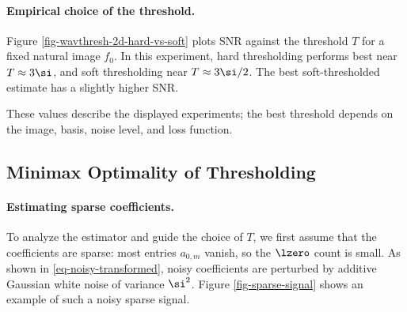 \paragraph{Empirical choice of the threshold.}

Figure \ref{fig-wavthresh-2d-hard-vs-soft} plots SNR against the threshold $T$ for a fixed natural image $f_0$. In this experiment, hard thresholding performs best near $T \approx 3\si$, and soft thresholding near $T\approx 3\si/2$. The best soft-thresholded estimate has a slightly higher SNR.


These values describe the displayed experiments; the best threshold depends on the image, basis, noise level, and loss function.


\subsection{Minimax Optimality of Thresholding}
\label{subsec-minimax-denoise}

\paragraph{Estimating sparse coefficients.}

To analyze the estimator and guide the choice of $T$, we first assume that the coefficients
are sparse: most entries $a_{0,m}$ vanish, so the $\lzero$ count
is small. 
As shown in \eqref{eq-noisy-transformed}, noisy coefficients 
are perturbed by additive Gaussian white noise of variance $\si^2$. Figure \ref{fig-sparse-signal} shows an example of such a noisy sparse signal.




